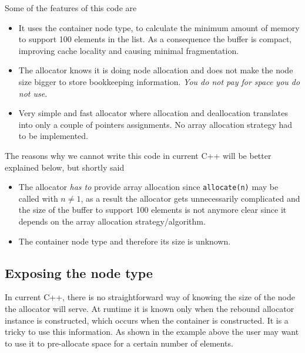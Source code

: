 \documentclass[11pt]{article}
\begin{document}
Some of the features of this code are
\begin{itemize}

\item It uses the container node type, to calculate the minimum amount of
memory to support 100 elements in the list. As a consequence the buffer is
compact, improving cache locality and causing minimal fragmentation.

\item The allocator knows it is doing node allocation and does not make the
node size bigger to store bookkeeping information. {\it You do not pay for
space you do not use}. 

\item Very simple and fast allocator where allocation and deallocation
translates into only a couple of pointers assignments. No array allocation
strategy had to be implemented.
\end{itemize}

The reasons why we cannot write this code in current C++ will
be better explained below, but shortly said

\begin{itemize}

\item The allocator {\it has to} provide array allocation since 
\texttt{allocate(n)} may be called with $n \ne 1$, as a result
the allocator gets unnecessarily complicated and the size of the
buffer to support 100 elements is not anymore clear since it depends
on the array allocation strategy/algorithm.

\item The container node type and therefore its size is unknown.

\end{itemize}

\subsection{Exposing the node type}

In current C++, there is no straightforward way of knowing the size of the node
the allocator will serve.  At runtime it is known only when the rebound
allocator instance is constructed, which occurs when the container is
constructed. It is a tricky to use this information. As shown in the example
above the user may want to use it to pre-allocate space for a
certain number of elements.
\end{document}
